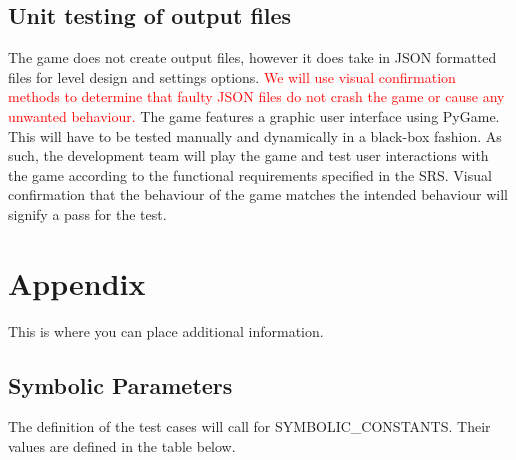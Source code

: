 \documentclass[12pt, titlepage]{article}
\begin{document}
\subsection{Unit testing of output files}
    The game does not create output files, however it does take in JSON formatted files for level design and settings options. \textcolor{red}{We will use visual confirmation methods to determine that faulty JSON files do not crash the game or cause any unwanted behaviour.} The game features a graphic user interface using PyGame. This will have to be tested manually and dynamically in a black-box fashion. As such, the development team will play the game and test user interactions with the game according to the functional requirements specified in the SRS. Visual confirmation that the behaviour of the game matches the intended behaviour will signify a pass for the test.




\newpage

\section{Appendix}

This is where you can place additional information.

\subsection{Symbolic Parameters}

The definition of the test cases will call for SYMBOLIC\_CONSTANTS.
Their values are defined in the table below.
\end{document}
